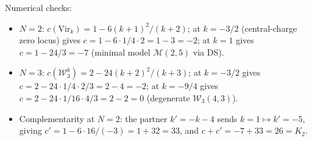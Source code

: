 \begin{remark}
Numerical checks:
\begin{itemize}
\item $N=2$: $c(\mathrm{Vir}_{k}) = 1 - 6(k+1)^2/(k+2)$; at $k=-3/2$ (central-charge zero locus) gives $c = 1 - 6 \cdot 1/4 \cdot 2 = 1 - 3 = -2$; at $k = 1$ gives $c = 1 - 24/3 = -7$ (minimal model $\mathcal{M}(2,5)$ via DS).
\item $N=3$: $c(\mathcal{W}_3^k) = 2 - 24(k+2)^2/(k+3)$; at $k = -3/2$ gives $c = 2 - 24 \cdot 1/4 \cdot 2/3 = 2 - 4 = -2$; at $k = -9/4$ gives $c = 2 - 24 \cdot 1/16 \cdot 4/3 = 2 - 2 = 0$ (degenerate $\mathcal{W}_3(4,3)$).
\item Complementarity at $N=2$: the partner $k' = -k - 4$ sends $k=1 \mapsto k' = -5$, giving $c' = 1 - 6 \cdot 16/(-3) = 1 + 32 = 33$, and $c + c' = -7 + 33 = 26 = K_2$.
\end{itemize}
\end{remark}

